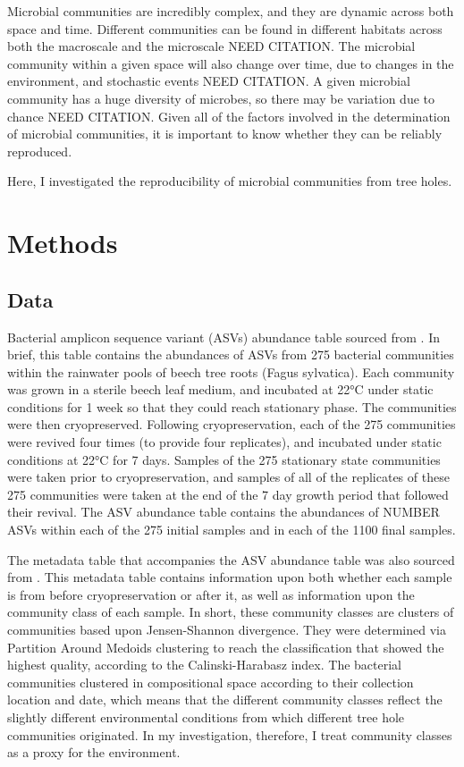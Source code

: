 \documentclass{article}
\begin{document}
Microbial communities are incredibly complex, and they are dynamic across both space and time. Different communities can be found in different habitats across both the macroscale and the microscale NEED CITATION.
The microbial community within a given space will also change over time, due to changes in the environment, and stochastic events NEED CITATION.
A given microbial community has a huge diversity of microbes, so there may be variation due to chance NEED CITATION.
Given all of the factors involved in the determination of microbial communities, it is important to know whether they can be reliably reproduced.

Here, I investigated the reproducibility of microbial communities from tree holes.

\section{Methods}
\subsection{Data}
Bacterial amplicon sequence variant (ASVs) abundance table sourced from \cite{Pascual-Garc}. In brief, this table contains the abundances of ASVs from 275 bacterial communities within the rainwater pools of beech tree roots (Fagus sylvatica). Each community was grown in a sterile beech leaf medium, and incubated at 22°C under static conditions for 1 week so that they could reach stationary phase. The communities were then cryopreserved. Following cryopreservation, each of the 275 communities were revived four times (to provide four replicates), and incubated under static conditions at 22°C for 7 days. Samples of the 275 stationary state communities were taken prior to cryopreservation, and samples of all of the replicates of these 275 communities were taken at the end of the 7 day growth period that followed their revival. The ASV abundance table contains the abundances of NUMBER ASVs within each of the 275 initial samples and in each of the 1100 final samples.

The metadata table that accompanies the ASV abundance table was also sourced from \cite{Pascual-Garc}. This metadata table contains information upon both whether each sample is from before cryopreservation or after it, as well as information upon the community class of each sample. In short, these community classes are clusters of communities based upon Jensen-Shannon divergence. They were determined via Partition Around Medoids clustering to reach the classification that showed the highest quality, according to the Calinski-Harabasz index. The bacterial communities clustered in compositional space according to their collection location and date, which means that the different community classes reflect the slightly different environmental conditions from which different tree hole communities originated. In my investigation, therefore, I treat community classes as a proxy for the environment.
\end{document}
